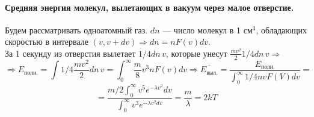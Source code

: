 \paragraph{ Средняя энергия молекул, вылетающих в вакуум через малое отверстие.} Будем рассматривать одноатомный газ. $dn$ --- число молекул в 1 см$^3$, обладающих скоростью в интервале $(v,v+dv)\Rightarrow dn=nF(v)dv$.\\
За 1 секунду из отверстия вылетает $1/4dn\,v$, которые унесут $\frac{mv^2}{2}1/4dn\,v\Rightarrow$
\[ \Rightarrow E_\text{полн.}=\int1/4\frac{mv^2}{2}dn\,v=\int_{0}^{\infty}\frac{m}{8}v^3nF(v)dv\Rightarrow \overline{E_\text{выл.}}=\frac{E_\text{полн.}}{\int_{0}^{\infty}1/4nvF(V)dv}=\]\[=\frac{m/2\int_{0}^{\infty}v^5e^{-\lambda v^2}dv}{\int_{0}^{\infty}v^3e^{-\lambda v^2dv}}=\frac{m}{\lambda}=2kT   \]